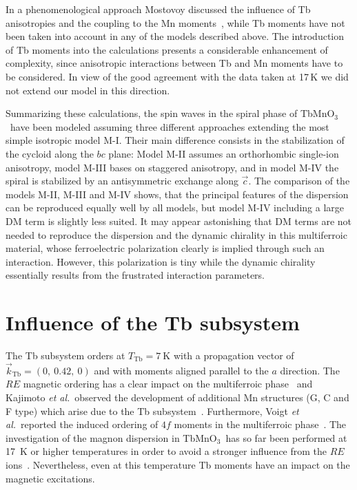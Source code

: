 \documentclass[aps,prb,twocolumn,superscriptaddress,showpacs,floatfix]{revtex4-2}
\newcommand{\tbmno}{TbMnO$_3$}
\newcommand{\caxis}{$\vec{c}$}
\newcommand{\etal}{\textit{et al.}}
\begin{document}
In a phenomenological approach  Mostovoy discussed the influence of Tb anisotropies and the coupling to the Mn moments~\cite{Mostovoy2006}, while Tb moments have not been taken into account in any of the models described above. The introduction of Tb moments into the calculations presents a considerable enhancement of complexity, since anisotropic interactions between Tb and Mn moments have to be considered. In view of the good agreement with the data taken at 17\,K we did not extend our model in this direction.

Summarizing these calculations, the spin waves in the spiral phase of \tbmno\ have been modeled assuming three different approaches extending the most simple isotropic model M-I. Their main difference consists in the stabilization of the cycloid along the $bc$ plane: Model M-II assumes an orthorhombic single-ion anisotropy, model M-III bases on staggered anisotropy, and in model M-IV the spiral is stabilized by an antisymmetric exchange along \caxis. The comparison of the models M-II, M-III and M-IV shows, that the principal features of the dispersion can be reproduced equally well by all models, but model M-IV including a large DM term is slightly less suited. 
It may appear astonishing that DM terms are not needed to reproduce the dispersion
and the dynamic chirality in this multiferroic material, whose ferroelectric polarization clearly is implied through such an interaction. However, this polarization is tiny while the dynamic chirality essentially results from the frustrated interaction parameters.



\section{Influence of the Tb subsystem}

The Tb subsystem orders at $T_{\textrm{Tb}}=\SI{7}{\kelvin}$ with a propagation vector of $\vec{k}_{\textrm{Tb}}=(0,~0.42,~0)$ and with moments aligned parallel to the $a$ direction. The $RE$ magnetic ordering has a clear impact on the multiferroic phase~\cite{Goto2005} and Kajimoto \etal\ observed the development of additional Mn structures (G, C and F type) which arise due to the Tb subsystem~\cite{Kajimoto2004}. Furthermore, Voigt \etal\ reported the induced ordering of $4f$ moments in the multiferroic phase~\cite{Voigt2007}. The investigation of the magnon dispersion in \tbmno\ has so far been performed at \SI{17}{\kelvin} or higher temperatures in order to avoid a stronger influence from the $RE$ ions~\cite{Senff2008a}. Nevertheless, even at this temperature Tb moments have an impact on the magnetic excitations.
\end{document}

